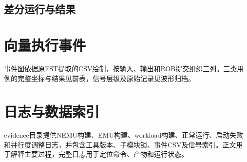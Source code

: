 \subsection{差分运行与结果}

\section{向量执行事件}
\begin{center}
\end{center}

事件图依据原FST提取的CSV绘制，按输入、输出和ROB提交组织三列。三类用例的完整坐标与结果见前表，信号层级及原始记录见波形归档。\par

\section{日志与数据索引}
evidence目录提供NEMU构建、EMU构建、workload构建、正常运行、启动失败和并行度调整日志，并包含工具版本、子模块锁、事件CSV及信号索引。正文用于解释主要过程，完整日志用于定位命令、产物和运行状态。\par
